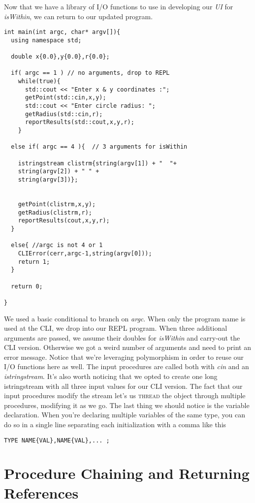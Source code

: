 \documentclass[nobib]{tufte-handout}
\begin{document}
Now that we have a library of I/O functions to use in developing our \textit{UI} for \textit{isWithin}, we can return to our updated program. 
\begin{verbatim}
int main(int argc, char* argv[]){
  using namespace std;

  double x{0.0},y{0.0},r{0.0};

  if( argc == 1 ) // no arguments, drop to REPL
    while(true){
      std::cout << "Enter x & y coordinates :";
      getPoint(std::cin,x,y);
      std::cout << "Enter circle radius: ";
      getRadius(std::cin,r);
      reportResults(std::cout,x,y,r);
    }
    
  else if( argc == 4 ){  // 3 arguments for isWithin

    istringstream clistrm{string(argv[1]) + "  "+
    string(argv[2]) + " " +
    string(argv[3])};


    getPoint(clistrm,x,y);
    getRadius(clistrm,r);
    reportResults(cout,x,y,r);
  }

  else{ //argc is not 4 or 1
    CLIError(cerr,argc-1,string(argv[0]));
    return 1;
  }

  return 0;

}
\end{verbatim}
We used a basic conditional to branch on \textit{argc}. When only the program name is used at the CLI, we drop into our REPL program. When three additional arguments are passed, we assume their doubles for \textit{isWithin} and carry-out the CLI version. Otherwise we got a weird number of arguments and need to print an error message. Notice that we're leveraging polymorphism in order to reuse our I/O functions here as well. The input procedures are called both with \textit{cin} and an \textit{istringstream}.  It's also worth noticing that we opted to create one long istringstream with all three input values for our CLI version. The fact that our input procedures modify the stream let's us \textsc{thread} the object through multiple procedures, modifying it as we go. The last thing we should notice is the variable declaration. When you're declaring multiple variables of the same type, you can do so in a single line separating each initialization with a comma like this
\begin{verbatim}
TYPE NAME{VAL},NAME{VAL},... ;
\end{verbatim}
 

\section{Procedure Chaining and Returning References}
\end{document}

